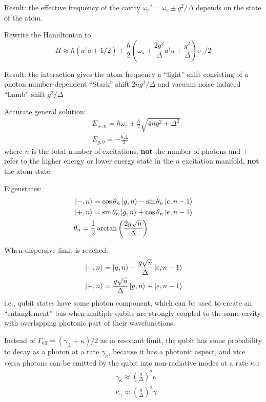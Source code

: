 \documentclass[8pt,a4paper,twocolumn]{article} %
\numberwithin{equation}{section} %
\begin{document}
			Result: the effective frequency of the cavity $ \omega_r'=\omega_r\pm g^2/\Delta $ depends on the state of the atom.

			Rewrite the Hamiltonian to
			\begin{equation}
				H\approx \hbar(a^{\dagger}a+1/2) +\frac{\hbar}{2} \left( \omega_a +\frac{2g^2}{\Delta}a^{\dagger}a + \frac{g^2}{\Delta}\right) \sigma_z /2
			\end{equation}

			Result: the interaction gives the atom frequency a ``light'' shift consisting of a photon number-dependent ``Stark'' shift $ 2ng^2/\Delta $ and vacuum noise induced ``Lamb'' shift $g^2/\Delta $

			Accurate general solution:
			\begin{align}
				&E_{\pm,n}=\hbar \omega_r\pm \frac{\hbar}{2} \sqrt{4ng^2+\Delta^2}\\
				&E_{g,0}=-\frac{\hbar \Delta}{2}
			\end{align}
			where $n$ is the total number of excitations, \textbf{not} the number of photons and $\pm$ refer to the higher energy or lower energy state in the $n$ excitation manifold, \textbf{not} the atom state.

			Eigenstates:
			\begin{align}
				& \ket{-,n} = \cos \theta_n \ket{g,n} -\sin \theta_n \ket{e,n-1}\\
				& \ket{+,n} = \sin \theta_n \ket{g,n} + \cos \theta_n \ket{e,n-1}\\
				& \theta_n = \frac{1}{2} \arctan \left( \frac{2g\sqrt n}{\Delta} \right)
			\end{align}

			When dispersive limit is reached:
			\begin{align}
				& \ket{-,n} =  \ket{g,n} -\frac{g\sqrt n}{\Delta}  \ket{e,n-1}\\
				& \ket{+,n} = \frac{g\sqrt n}{\Delta}  \ket{g,n} +   \ket{e,n-1}
			\end{align}
			i.e., qubit states have some photon component, which can be used to create an ``entanglement'' bus when multiple qubits are strongly coupled to the same cavity with overlapping photonic part of their wavefunctions.

			Instead of $\Gamma_{\text{eff} }=(\gamma_{\perp}+\kappa)/2 $ as in resonant limit, the qubit has some probability to decay as a photon at a rate $ \gamma_{\kappa} $, because it has a photonic aspect, and vice versa photons can be emitted by the qubit into non-radiative modes at a rate $\kappa_{\gamma} $:
			\begin{align}
				&\gamma_{\kappa}\approx \left( \frac{g}{\Delta} \right)^2 \kappa\\
				&\kappa_{\gamma}\approx \left( \frac{g}{\Delta} \right)^2 \gamma
			\end{align}
\end{document}
